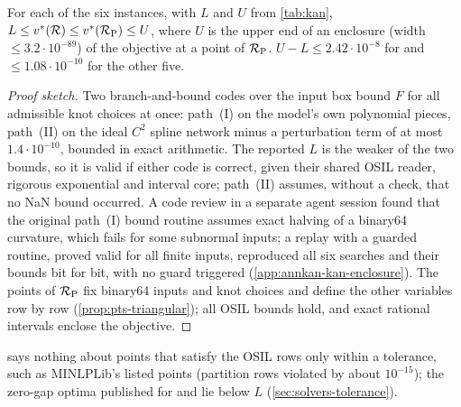 \begin{theorem}\label{thm:kan-enclosure}
For each of the six instances, with $L$ and $U$ from \cref{tab:kan},
$L\le v^{*}(\mathcal{R})\le v^{*}(\mathcal{R}_{\mathrm{P}})\le U$,
where $U$ is the upper end of an enclosure (width $\le3.2\cdot10^{-89}$) of the objective at a point of $\mathcal{R}_{\mathrm{P}}$.
$U-L\le2.42\cdot10^{-8}$ for  and $\le1.08\cdot10^{-10}$ for the other five.
\end{theorem}

\begin{proof}[Proof sketch]
Two branch-and-bound codes over the input box bound $F$ for all admissible knot choices at once: path~(I) on the model's own polynomial pieces, path~(II) on the ideal $C^2$ spline network minus a perturbation term of at most $1.4\cdot10^{-10}$, bounded in exact arithmetic.
The reported $L$ is the weaker of the two bounds, so it is valid if either code is correct, given their shared OSIL reader, rigorous exponential and interval core; path~(II) assumes, without a check, that no NaN bound occurred.
A code review in a separate agent session found that the original path~(I) bound routine assumes exact halving of a binary64 curvature, which fails for some subnormal inputs; a replay with a guarded routine, proved valid for all finite inputs, reproduced all six searches and their bounds bit for bit, with no guard triggered (\cref{app:annkan-kan-enclosure}).
The points of $\mathcal{R}_{\mathrm{P}}$ fix binary64 inputs and knot choices and define the other variables row by row (\cref{prop:pts-triangular}); all OSIL bounds hold, and exact rational intervals enclose the objective.
\end{proof}

 says nothing about points that satisfy the OSIL rows only within a tolerance, such as MINLPLib's listed points (partition rows violated by about $10^{-15}$); the zero-gap optima published for  and  lie below $L$ (\cref{sec:solvers-tolerance}).
